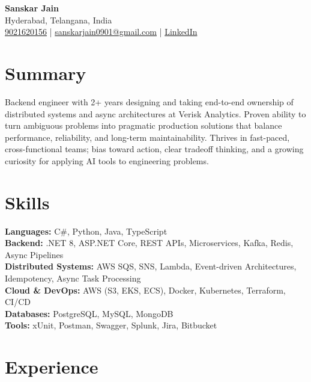 \documentclass[a4paper,10pt]{article}
\begin{document}
\begin{center}
    {\LARGE \textbf{Sanskar Jain}} \\
    Hyderabad, Telangana, India \\
    \href{tel:9021620156}{9021620156} \;|\;
    \href{mailto:sanskarjain0901@gmail.com}{sanskarjain0901@gmail.com} \;|\;
    \href{https://www.linkedin.com/in/sanskar-jain0901/}{LinkedIn}
\end{center}

\vspace{3pt}

\section*{Summary}
Backend engineer with 2+ years designing and taking end-to-end ownership of distributed systems and async architectures at Verisk Analytics.
Proven ability to turn ambiguous problems into pragmatic production solutions that balance performance, reliability, and long-term maintainability.
Thrives in fast-paced, cross-functional teams; bias toward action, clear tradeoff thinking, and a growing curiosity for applying AI tools to engineering problems.

\section*{Skills}
\textbf{Languages:} C\#, Python, Java, TypeScript \\
\textbf{Backend:} .NET 8, ASP.NET Core, REST APIs, Microservices, Kafka, Redis, Async Pipelines \\
\textbf{Distributed Systems:} AWS SQS, SNS, Lambda, Event-driven Architectures, Idempotency, Async Task Processing \\
\textbf{Cloud \& DevOps:} AWS (S3, EKS, ECS), Docker, Kubernetes, Terraform, CI/CD \\
\textbf{Databases:} PostgreSQL, MySQL, MongoDB \\
\textbf{Tools:} xUnit, Postman, Swagger, Splunk, Jira, Bitbucket

\section*{Experience}
\end{document}
